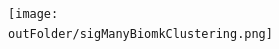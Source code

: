 \begin{frame}
\begin{columns}[T]
\begin{column}{.7\textwidth}
\begin{itemize}
  \end{itemize}
     

    \end{column}
    \begin{column}{.3\textwidth}

    
       
    \begin{figure}
    \centering
    \texttt{[image: \\outFolder/sigManyBiomkClustering.png]}
    \end{figure}
    

    \end{column}
  \end{columns}
  
% 
%   


\end{frame}




